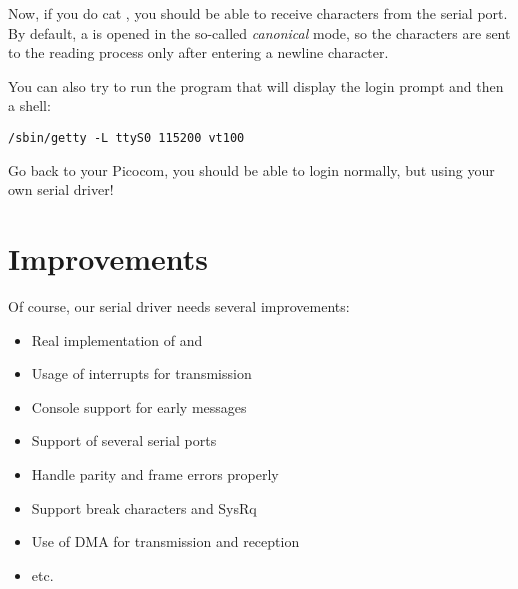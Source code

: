 Now, if you do cat , you should be able to receive
characters from the serial port. By default, a  is opened in the
so-called {\em canonical} mode, so the characters are sent to the reading
process only after entering a newline character.

You can also try to run the program that will display the login prompt
and then a shell:

\begin{verbatim}
/sbin/getty -L ttyS0 115200 vt100
\end{verbatim}

Go back to your Picocom, you should be able to login normally, but
using your own serial driver!

\section{Improvements}

Of course, our serial driver needs several improvements:

\begin{itemize}
\item Real implementation of  and 
\item Usage of interrupts for transmission
\item Console support for early messages
\item Support of several serial ports
\item Handle parity and frame errors properly
\item Support break characters and SysRq
\item Use of DMA for transmission and reception
\item etc.
\end{itemize}
